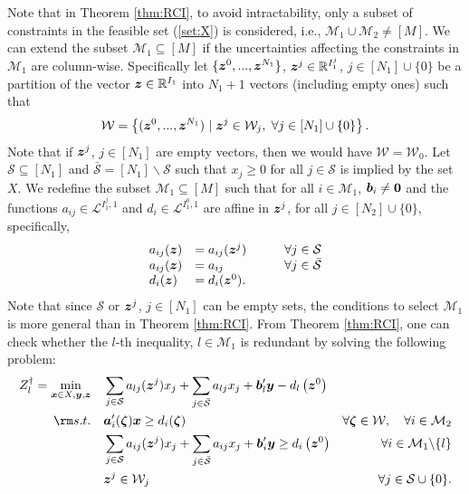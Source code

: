 \documentclass[fleqn,mnsc,blindrev]{informs4}
\newcommand{\mb}[1]{\mbox{\boldmath \ensuremath{#1}}}
\renewcommand{\Re}{\mathbb{R}}
\begin{document}
		Note that in Theorem \ref{thm:RCI}, to avoid intractability, only a subset of constraints in the feasible set (\ref{set:X}) is considered, i.e.,  $\mathcal{M}_1 \cup \mathcal{M}_2  \ne [M]$. We can extend the subset $\mathcal{M}_1 \subseteq[M]$ if the uncertainties affecting the constraints in $\mathcal{M}_1$ are column-wise.
		Specifically let $\{ \mb{z}^0,...,\mb{z}^{N_1}\}$, $\mb{z}^j\in \Re^{I_1^j}$, $j \in [N_1]\cup\{0\}$ be a partition of the vector $\mb{z} \in \mathbb{R}^{I_1}$ into $N_1+1$ vectors  (including empty ones) such that 
\begin{equation} \label{set:UScw} 
			\mathcal{W} = \left\{ (\mb{z}^0,...,\mb{z}^{N_1}) \hspace{3pt} | \hspace{3pt} \mb{z}^j \in \mathcal{W}_j, \hspace{3pt} \forall j \in [N_1]\cup \{0\} \right\}.
\end{equation}
		Note that if $\mb{z}^j$, $j \in [N_1]$ are empty vectors, then we would have $\mathcal{W} = \mathcal{W}_0$.  
		Let $\mathcal{S} \subseteq [N_1]$ and $\bar{\mathcal{S}} =[N_1] \backslash \mathcal{S}$ such that $x_j \geq 0$ for all $j \in \mathcal{S}$ is implied by the set $X$.  
		We redefine the subset $\mathcal{M}_1 \subseteq [M]$  such that for all $i \in  \mathcal{M}_1$, $\mb{b}_i \neq \mb{0}$ and  the functions $a_{ij}\in \mathcal{L}^{I_1^j, 1}$  and $d_i \in \mathcal{L}^{I_1^0, 1}$ are affine in  $\mb{z}^j$, for all $j \in [N_2]\cup \{0\}$, specifically, 
\begin{equation*}
		\begin{array}{lll}
		a_{ij}(\mb{z}) &= a_{ij}(\mb{z}^j) & \qquad\forall j \in \mathcal{S}\\
		a_{ij}(\mb{z}) &= a_{ij} & \qquad\forall j \in \bar{\mathcal{S}}\\
		d_i(\mb{z}) &= d_i(\mb{z}^0).
		\end{array}
\end{equation*}
		Note that since $\mathcal{S}$ or $\mb{z}^j$, $j \in [N_1]$ can be empty sets, the conditions to select $\mathcal{M}_1$ is more general than in Theorem \ref{thm:RCI}.  From Theorem \ref{thm:RCI}, one can check whether the $l$-th inequality, $l \in \mathcal{M}_1$  is redundant by solving the following problem:
\begin{equation}\label{mol:RCIcw}
			\begin{aligned} 
				Z^\dag_l =	\min_{ \boldsymbol{x} \in X , \boldsymbol{y}, \boldsymbol{z}} \quad &  \sum_{j\in \mathcal{S}} a_{lj}(\mb{z}^j) x_j + \sum_{j\in \bar{\mathcal{S} }} a_{lj} x_j  + \mb{b}'_l \mb{y} - d_l\left(\mb{z}^0\right)  \\
				{\rm s.t.}  \quad &  \mb{a}'_i(\mb{\zeta})\mb{x} \geq d_i(\mb{\zeta}) &  \forall  \mb{\zeta} \in  \mathcal{W}, \quad \forall i  \in \mathcal{M}_2 \\
				\quad &  \sum_{j\in \mathcal{S}} a_{ij}(\mb{z}^j) x_j + \sum_{j\in \bar{\mathcal{S} }} a_{ij} x_j  +\mb{b}'_i \mb{y} \geq d_i\left(\mb{z}^0\right)  &  \forall i  \in \mathcal{M}_1 \backslash \{l\} \\
				\quad & \mb{z}^j \in \mathcal{W}_j  &  \forall j  \in \mathcal{S} \cup \{0\}.
			\end{aligned}
\end{equation}
\end{document}
